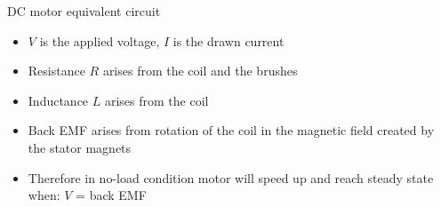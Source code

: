 \documentclass[compress]{beamer}
\begin{document}
\begin{frame}{DC motor equivalent circuit}

    \begin{center}
    \end{center}

\footnotesize
\begin{itemize}

\item $V$ is the applied voltage, $I$ is the drawn current
\item Resistance $R$ arises from the coil and the brushes
\item Inductance $L$ arises from the coil
\item Back EMF arises from rotation of the coil in the magnetic field
  created by the stator magnets
\item Therefore in no-load condition motor will speed up and reach steady
  state when: $V$ = back EMF
\end{itemize}

\end{frame}
\end{document}

